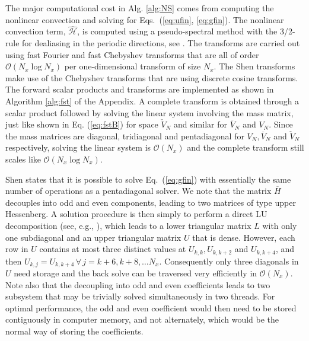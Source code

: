 \documentclass[preprint]{elsarticle}
\newcommand{\N}[1]{\check{#1}}
\newcommand{\D}[1]{\overline{#1}}
\begin{document}
The major computational cost in Alg. \ref{alg:NS} comes from  computing the 
nonlinear convection and solving for Eqs.~(\ref{eq:ufin}, \ref{eq:gfin}). The 
nonlinear convection term, $\bm{\hat{\mathcal{H}}}$, is computed using a 
pseudo-spectral method with the 3/2-rule for dealiasing in the periodic 
directions, see \cite{canuto1988}. The 
transforms are carried out using fast Fourier and fast Chebyshev transforms 
that are all of order $\mathcal{O}(N_x\log N_x)$ per one-dimensional transform of size 
$N_x$. The Shen transforms make use of the Chebyshev transforms that are using 
discrete cosine transforms. The forward scalar products and transforms are implemented as shown 
in Algorithm \ref{alg:fst} of the Appendix. A complete transform is obtained through a scalar 
product followed by solving the linear system involving the mass 
matrix, just like shown in Eq. (\ref{eq:fstB}) for space $\N{V}_N$ and similar 
for $\D{V}_N$ and $V_N$. Since the mass matrices are diagonal, tridiagonal and 
pentadiagonal for $V_N, \D{V}_N$ and $\N{V}_N$ respectively, solving the linear 
system is $\mathcal{O}(N_x)$ and the complete transform still scales like $\mathcal{O}(N_x\log N_x)$. 

Shen \cite{Shen95} states that it is possible to solve Eq.~(\ref{eq:gfin}) 
with 
essentially the same number of operations as a pentadiagonal solver. We note 
that the matrix 
$\D{H}$ decouples into odd and even components, leading to two matrices of type upper Hessenberg. A solution
procedure is then simply to perform a direct LU decomposition (see, e.g., 
\cite{stewart98}), which leads to a 
lower triangular  
matrix $L$ with only one subdiagonal and an upper triangular matrix $U$ that 
is dense. However, each row in $U$ 
contains at most three distinct values at $U_{k,k}, U_{k,k+2}$ and $U_{k,k+4}$, 
and then $U_{k,j} = U_{k,k+4}\, \forall \, j = k+6, k+8, \ldots N_x$. 
Consequently 
only three diagonals in $U$ need storage and the back solve can be traversed 
very efficiently in $\mathcal{O}(N_x)$. Note also that the decoupling into 
odd and even coefficients leads to two subsystem that may be trivially 
solved simultaneously in two threads. For optimal 
performance, the odd and even coefficient would then need to be stored 
contiguously in computer memory, and not alternately, which would be the normal way of storing the coefficients.

\end{document}
